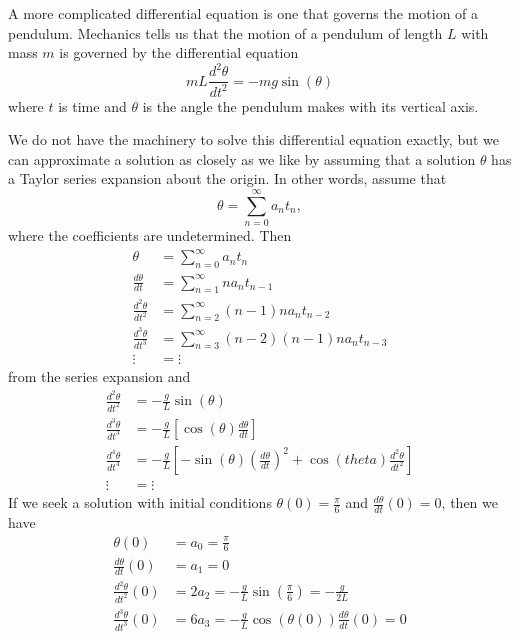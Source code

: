 \begin{exercises}
\begin{exerciseSolution}
\end{exerciseSolution}

    \ea

\begin{exerciseSolution}

\item A more complicated differential equation is one that governs the motion of a pendulum. Mechanics tells us that the motion of a pendulum of length $L$ with mass $m$ is governed by the differential equation
\[mL \frac{d^2 \theta}{d t^2} = -mg \sin(\theta)\]
where $t$ is time and $\theta$ is the angle the pendulum makes with its vertical axis.

We do not have the machinery to solve this differential equation exactly, but we can approximate a solution as closely as we like by assuming that a solution $\theta$ has a Taylor series expansion about the origin. In other words, assume that
\[\theta = \sum_{n=0}^{\infty} a_nt_n,\]
where the coefficients are undetermined. Then
\begin{align*}
\theta &= \sum_{n=0}^{\infty} a_nt_n \\
\frac{d \theta}{dt} &= \sum_{n=1}^{\infty} na_nt_{n-1} \\
\frac{d^2 \theta}{dt^2} &= \sum_{n=2}^{\infty} (n-1)na_nt_{n-2} \\
\frac{d^3 \theta}{dt^3} &= \sum_{n=3}^{\infty} (n-2)(n-1)na_nt_{n-3} \\
\vdots &= \vdots
\end{align*}
from the series expansion and
\begin{align*}
\frac{d^2 \theta}{dt^2} &= -\frac{g}{L} \sin\left(\theta\right)  \\
\frac{d^3 \theta}{dt^3} &= -\frac{g}{L}\left[\cos(\theta)\frac{d \theta}{dt}\right]  \\
\frac{d^4 \theta}{dt^4} &= -\frac{g}{L}\left[-\sin(\theta)\left(\frac{d \theta}{dt}\right)^2 + \cos(theta)\frac{d^2 \theta}{dt^2} \right]  \\
\vdots &= \vdots
\end{align*}
If we seek a solution with initial conditions $\theta(0) = \frac{\pi}{6}$ and $\frac{d \theta}{dt}(0) = 0$, then we have
\begin{align*}
\theta(0) &= a_0 = \frac{\pi}{6} \\
\frac{d \theta}{dt}(0) &= a_1 = 0  \\
\frac{d^2 \theta}{dt^2}(0) &= 2a_2 = -\frac{g}{L} \sin\left(\frac{\pi}{6}\right) = -\frac{g}{2L}  \\
\frac{d^3 \theta}{dt^3}(0) &= 6a_3 = -\frac{g}{L}\cos(\theta(0))\frac{d \theta}{dt}(0) = 0  \\

\end{align*}
\end{exerciseSolution}
\end{exercises}
